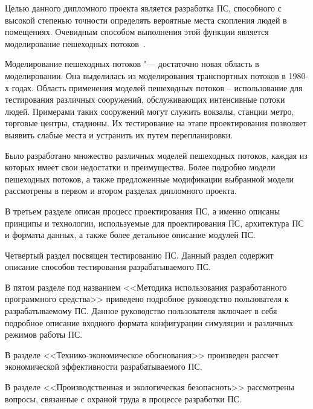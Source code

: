 \label{sec:intro}

Целью данного дипломного проекта является разработка ПС, способного с высокой степенью точности определять вероятные места скопления людей в помещениях.
Очевидным способом выполнения этой функции является моделирование пешеходных потоков~\cite{shennon_modeling}.

Моделирование пешеходных потоков "--- достаточно новая область в моделировании. Она выделилась из моделирования транспортных потоков в 1980-х годах.
Область применения моделей пешеходных потоков – использование для тестирования различных сооружений, обслуживающих интенсивные потоки людей.
Примерами таких сооружений могут служить вокзалы, станции метро, торговые центры, стадионы. Их тестирование на этапе проектирования позволяет выявить слабые места и устранить их путем перепланировки.

Было разработано множество различных моделей пешеходных потоков, каждая из которых имеет свои недостатки и преимущества.
Более подробно модели пешеходных потоков, а также предложенные модификации выбранной модели рассмотрены в первом и втором разделах дипломного проекта.

В третьем разделе описан процесс проектирования ПС, а именно описаны принципы и технологии, используемые для проектирования ПС, архитектура ПС и форматы данных, а также более детальное описание модулей ПС.

Четвертый раздел посвящен тестированию ПС. Данный раздел содержит описание способов тестирования разрабатываемого ПС.

В пятом разделе под названием <<Методика использования разработанного программного средства>> приведено подробное руководство пользователя к разрабатываемому ПС. Данное руководство пользователя включает в себя подробное описание входного формата конфигурации симуляции и различных режимов работы ПС.

В разделе <<Технико-экономическое обоснования>> произведен рассчет экономической эффективности разрабатываемого ПС.

В разделе <<Производственная и экологическая безопасноть>> рассмотрены вопросы, связанные с охраной труда в процессе разработки ПС.
